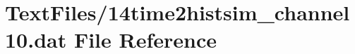 \hypertarget{14time2histsim__channel10_8dat}{}\section{Text\+Files/14time2histsim\+\_\+channel10.dat File Reference}
\label{14time2histsim__channel10_8dat}
